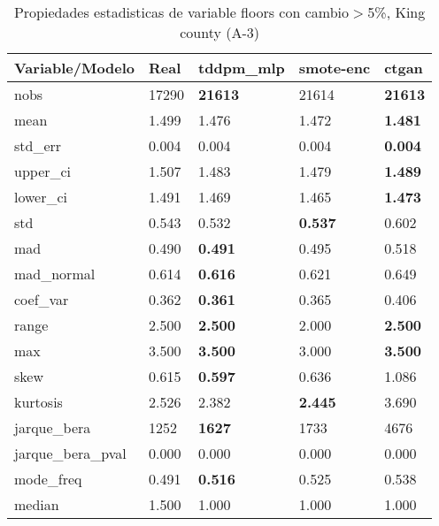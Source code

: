 \begin{table}[H]
\centering
\fontsize{8}{14}\selectfont
\caption{Propiedades estadisticas de variable floors con cambio\ensuremath{>}5\%, King county (A-3)}
\label{table-stats-king county-a-3-floors-short}
\begin{tabular}{|l|m{10em}|m{10em}|m{10em}|m{10em}|}
\hline
 \rowcolor[gray]{0.8}
Variable/Modelo & Real & tddpm\_mlp & smote-enc & ctgan \\
\hline nobs & 17290 & \bfseries 21613 & \cellcolor[rgb]{0.9, 0.54, 0.52} 21614 & \bfseries 21613 \\
\hline mean & 1.499 & 1.476 & \cellcolor[rgb]{0.9, 0.54, 0.52} 1.472 & \bfseries 1.481 \\
\hline std\_err & 0.004 & \cellcolor[rgb]{0.9, 0.54, 0.52} 0.004 & 0.004 & \bfseries 0.004 \\
\hline upper\_ci & 1.507 & 1.483 & \cellcolor[rgb]{0.9, 0.54, 0.52} 1.479 & \bfseries 1.489 \\
\hline lower\_ci & 1.491 & 1.469 & \cellcolor[rgb]{0.9, 0.54, 0.52} 1.465 & \bfseries 1.473 \\
\hline std & 0.543 & 0.532 & \bfseries 0.537 & \cellcolor[rgb]{0.9, 0.54, 0.52} 0.602 \\
\hline mad & 0.490 & \bfseries 0.491 & 0.495 & \cellcolor[rgb]{0.9, 0.54, 0.52} 0.518 \\
\hline mad\_normal & 0.614 & \bfseries 0.616 & 0.621 & \cellcolor[rgb]{0.9, 0.54, 0.52} 0.649 \\
\hline coef\_var & 0.362 & \bfseries 0.361 & 0.365 & \cellcolor[rgb]{0.9, 0.54, 0.52} 0.406 \\
\hline range & 2.500 & \bfseries 2.500 & \cellcolor[rgb]{0.9, 0.54, 0.52} 2.000 & \bfseries 2.500 \\
\hline max & 3.500 & \bfseries 3.500 & \cellcolor[rgb]{0.9, 0.54, 0.52} 3.000 & \bfseries 3.500 \\
\hline skew & 0.615 & \bfseries 0.597 & 0.636 & \cellcolor[rgb]{0.9, 0.54, 0.52} 1.086 \\
\hline kurtosis & 2.526 & 2.382 & \bfseries 2.445 & \cellcolor[rgb]{0.9, 0.54, 0.52} 3.690 \\
\hline jarque\_bera & 1252 & \bfseries 1627 & 1733 & \cellcolor[rgb]{0.9, 0.54, 0.52} 4676 \\
\hline jarque\_bera\_pval & 0.000 & 0.000 & 0.000 & 0.000 \\
\hline mode\_freq & 0.491 & \bfseries 0.516 & 0.525 & \cellcolor[rgb]{0.9, 0.54, 0.52} 0.538 \\
\hline median & 1.500 & 1.000 & 1.000 & 1.000 \\
\hline
\end{tabular}
\end{table}
